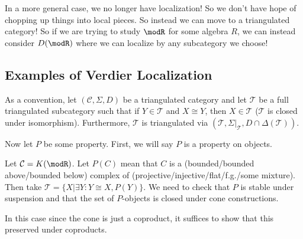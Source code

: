 \documentclass[12pt]{article}
\begin{document}
In a more general case, we no longer have localization! So we don't have hope of chopping up things into local pieces.
So instead we can move to a triangulated category! So if we are trying to study $\modR$ for some algebra $R$,
we can instead consider $D(\modR)$ where we can localize by any subcategory we choose!

\subsection{Examples of Verdier Localization}
As a convention, let $(\mathcal{C},\Sigma,D)$ be a triangulated category and let $\mathcal{T}$ be a full triangulated subcategory
such that if $Y\in\mathcal T$ and $X\cong Y$, then $X\in\mathcal T$ ($\mathcal T$ is closed under isomorphism). Furthermore, $\mathcal T$ is 
triangulated via $(\mathcal{T}, \Sigma|_{\mathcal T}, D\cap\Delta(\mathcal{T}))$.

Now let $P$ be some property. First, we will say $P$ is a property on objects.

\begin{ex}
	Let $\mathcal C=K(\modR)$. Let $P(C)$ mean that $C$ is a (bounded/bounded above/bounded below) complex of 
	(projective/injective/flat/f.g./some mixture). Then take $\mathcal T=\{X|\exists Y: Y\cong X,P(Y)\}$. We need to check that $P$ is 
	stable under suspension and that the set of $P$-objects is closed under cone constructions.

	In this case since the cone is just a coproduct, it suffices to show that this preserved under coproducts.
\end{ex}
\end{document}
